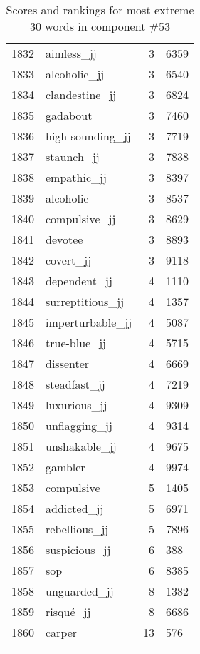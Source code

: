 \begin{longtable}[!htbp]{| rlr@{.}l |}
    1832 & aimless\_jj & 3 & 6359 \\
    1833 & alcoholic\_jj & 3 & 6540 \\
    1834 & clandestine\_jj & 3 & 6824 \\
    1835 & gadabout & 3 & 7460 \\
    1836 & high-sounding\_jj & 3 & 7719 \\
    1837 & staunch\_jj & 3 & 7838 \\
    1838 & empathic\_jj & 3 & 8397 \\
    1839 & alcoholic & 3 & 8537 \\
    1840 & compulsive\_jj & 3 & 8629 \\
    1841 & devotee & 3 & 8893 \\
    1842 & covert\_jj & 3 & 9118 \\
    1843 & dependent\_jj & 4 & 1110 \\
    1844 & surreptitious\_jj & 4 & 1357 \\
    1845 & imperturbable\_jj & 4 & 5087 \\
    1846 & true-blue\_jj & 4 & 5715 \\
    1847 & dissenter & 4 & 6669 \\
    1848 & steadfast\_jj & 4 & 7219 \\
    1849 & luxurious\_jj & 4 & 9309 \\
    1850 & unflagging\_jj & 4 & 9314 \\
    1851 & unshakable\_jj & 4 & 9675 \\
    1852 & gambler & 4 & 9974 \\
    1853 & compulsive & 5 & 1405 \\
    1854 & addicted\_jj & 5 & 6971 \\
    1855 & rebellious\_jj & 5 & 7896 \\
    1856 & suspicious\_jj & 6 & 388 \\
    1857 & sop & 6 & 8385 \\
    1858 & unguarded\_jj & 8 & 1382 \\
    1859 & risqué\_jj & 8 & 6686 \\
    1860 & carper & 13 & 576 \\
    \hline
    \caption{Scores and rankings for most extreme 30 words in component \#53} \\
\end{longtable}
